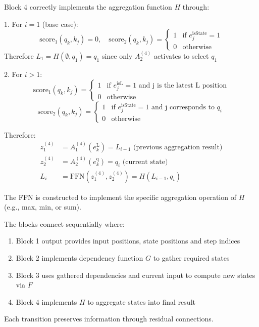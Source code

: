 \begin{lemma}
Block 4 correctly implements the aggregation function $H$ through:

1. For $i=1$ (base case):
\begin{equation*}
    \text{score}_1(q_k, k_j) = 0, \quad \text{score}_2(q_k, k_j) = \begin{cases}
        1 & \text{if } e^{\text{isState}}_j = 1 \\
        0 & \text{otherwise}
    \end{cases}
\end{equation*}
Therefore $L_1 = H(\emptyset, q_1) = q_1$ since only $A^{(4)}_2$ activates to select $q_1$

2. For $i>1$:
\begin{equation*}
    \text{score}_1(q_k, k_j) = \begin{cases}
        1 & \text{if } e^{\text{isL}}_j = 1 \text{ and j is the latest L position} \\
        0 & \text{otherwise}
    \end{cases}
\end{equation*}
\begin{equation*}
    \text{score}_2(q_k, k_j) = \begin{cases}
        1 & \text{if } e^{\text{isState}}_j = 1 \text{ and j corresponds to } q_i \\
        0 & \text{otherwise}
    \end{cases}
\end{equation*}

Therefore:
\begin{align*}
    z^{(4)}_1 &= A^{(4)}_1(e^{\text{L}}_k) = L_{i-1} \text{ (previous aggregation result)} \\
    z^{(4)}_2 &= A^{(4)}_2(e^{\text{q}}_k) = q_i \text{ (current state)} \\
    L_i &= \text{FFN}(z^{(4)}_1, z^{(4)}_2) = H(L_{i-1}, q_i)
\end{align*}

The FFN is constructed to implement the specific aggregation operation of $H$ (e.g., max, min, or sum).
\end{lemma}

\begin{proposition}
The blocks connect sequentially where:
\begin{enumerate}
    \item Block 1 output provides input positions, state positions and step indices
    \item Block 2 implements dependency function $G$ to gather required states
    \item Block 3 uses gathered dependencies and current input to compute new states via $F$
    \item Block 4 implements $H$ to aggregate states into final result
\end{enumerate}
Each transition preserves information through residual connections.
\end{proposition}
